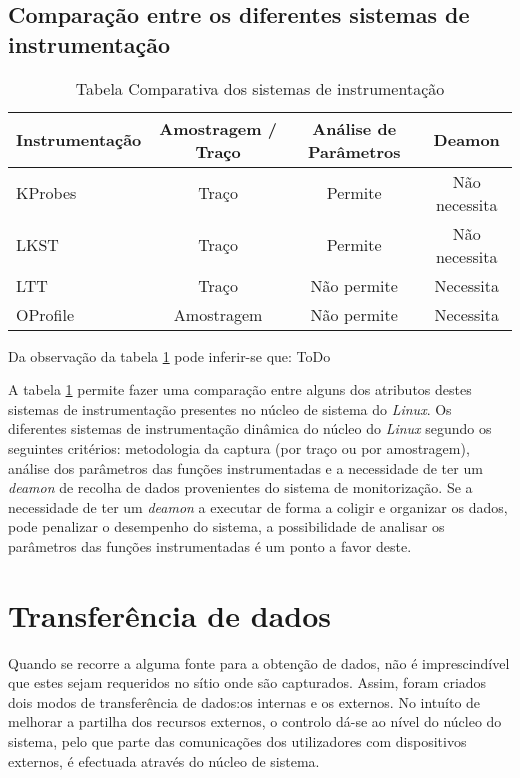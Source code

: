 \subsection{Comparação entre os diferentes sistemas de instrumentação}
\begin{table}[h!]
\begin{center}
\caption{Tabela Comparativa dos sistemas de instrumentação}
\label{tab:inst_compare}
\begin{tabular}{|l||c|c|c|}
\hline
Instrumentação & Amostragem / Traço & Análise de Parâmetros & Deamon \\
\hline
KProbes & Traço & Permite & Não necessita \\
\hline
LKST & Traço & Permite & Não necessita \\
\hline
LTT & Traço & Não permite & Necessita \\
\hline
OProfile & Amostragem & Não permite & Necessita \\
\hline


\end{tabular}
\end{center}
\end{table}

Da observação da tabela \ref{tab:inst_compare} pode inferir-se que: ToDo

A tabela \ref{tab:inst_compare} permite fazer uma comparação entre alguns dos atributos destes sistemas de instrumentação presentes no núcleo de sistema do \textit{Linux}.
Os diferentes sistemas de instrumentação dinâmica do núcleo do \textit{Linux} segundo os seguintes critérios: metodologia da captura (por traço ou por amostragem), análise dos parâmetros das funções instrumentadas e a necessidade de ter um \textit{deamon} de recolha de dados provenientes do sistema de monitorização.
Se a necessidade de ter um \textit{deamon} a executar de forma a coligir e organizar os dados, pode penalizar o desempenho do sistema, a possibilidade de analisar os parâmetros das funções instrumentadas é um ponto a favor deste.

\section{Transferência de dados}
\label{sect:kernel_user_comm}

Quando se recorre a alguma fonte para a obtenção de dados, não é imprescindível que estes sejam requeridos no sítio onde são capturados.
Assim, foram criados dois modos de transferência de dados:os internas e os externos.
No intuíto de melhorar a partilha dos recursos externos, o controlo dá-se ao nível do núcleo do sistema, pelo que parte das comunicações dos utilizadores com dispositivos externos, é efectuada através do núcleo de sistema.

